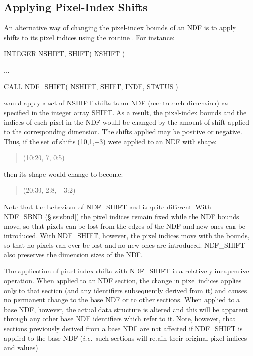 \documentclass[twoside,11pt,nolof]{starlink}
\providecommand{\st}[1]{{\emph{#1}}}
\begin{document}
\subsection{\label{ss:shift}Applying Pixel-Index Shifts}

An alternative way of changing the pixel-index bounds of an NDF is to apply
shifts to its pixel indices using the routine .
For instance:

\small
\begin{terminalv}
      INTEGER NSHIFT, SHIFT( NSHIFT )

      ...

      CALL NDF_SHIFT( NSHIFT, SHIFT, INDF, STATUS )
\end{terminalv}
\normalsize

would apply a set of NSHIFT shifts to an NDF (one to each dimension) as
specified in the integer array SHIFT.
As a result, the pixel-index bounds and the indices of each pixel in the NDF
would be changed by the amount of shift applied to the corresponding
dimension.
The shifts applied may be positive or negative.
Thus, if the set of shifts (10,1,$-$3) were applied to an NDF with shape:

\small
\begin{quote}
\begin{center}
(10:20, 7, 0:5)
\end{center}
\end{quote}
\normalsize

then its shape would change to become:

\small
\begin{quote}
\begin{center}
(20:30, 2:8, $-$3:2)
\end{center}
\end{quote}
\normalsize

Note that the behaviour of NDF\_SHIFT and  is quite different.
With NDF\_SBND (\S\ref{ss:sbnd}) the pixel indices remain fixed while the NDF
bounds move, so that pixels can be lost from the edges of the NDF and new
ones can be introduced.
With NDF\_SHIFT, however, the pixel indices move with the bounds, so that
no pixels can ever be lost and no new ones are introduced.
NDF\_SHIFT also preserves the dimension sizes of the NDF.

The application of pixel-index shifts with NDF\_SHIFT is a relatively
inexpensive operation.
When applied to an NDF section, the change in pixel indices applies only to
that section (and any identifiers subsequently derived from it) and causes
no permanent change to the base NDF or to other sections.
When applied to a base NDF, however, the actual data structure is altered and
this will be apparent through any other base NDF identifiers which refer to
it.
Note, however, that sections previously derived from a base NDF are not
affected if NDF\_SHIFT is applied to the base NDF (\st{i.e.}\ such sections
will retain their original pixel indices and values).
\end{document}

